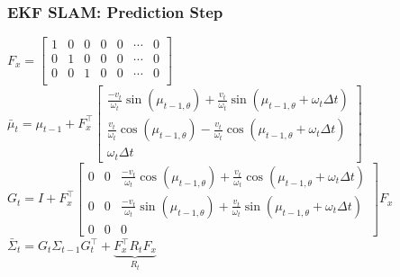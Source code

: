 \begin{frame}
    \frametitle{EKF SLAM: Prediction Step}

    \begin{algorithmic}[1]
        \State $F_x = \begin{bmatrix}
        1 & 0 & 0 & 0 & 0 & \cdots & 0 \\
        0 & 1 & 0 & 0 & 0 & \cdots & 0 \\
        0 & 0 & 1 & 0 & 0 & \cdots & 0 \\
        \end{bmatrix}$
        \vspace{1em}
        \State $\bar{\mu}_t = \mu_{t-1} + F_x^{\top}
        \begin{bmatrix}
        \frac{-v_t}{\omega_t} \sin(\mu_{t-1,\theta}) + \frac{v_t}{\omega_t} \sin(\mu_{t-1,\theta} + \omega_t \Delta t) \\
        \frac{v_t}{\omega_t} \cos(\mu_{t-1,\theta}) - \frac{v_t}{\omega_t} \cos(\mu_{t-1,\theta} + \omega_t \Delta t) \\
        \omega_t \Delta t
        \end{bmatrix}$
        \vspace{1em}
        \State $G_t = I + F_x^{\top}
        \begin{bmatrix}
        0 & 0 & \frac{-v_t}{\omega_t} \cos(\mu_{t-1,\theta}) + \frac{v_t}{\omega_t} \cos(\mu_{t-1,\theta} + \omega_t \Delta t) \\
        0 & 0 & \frac{-v_t}{\omega_t} \sin(\mu_{t-1,\theta}) + \frac{v_t}{\omega_t} \sin(\mu_{t-1,\theta} + \omega_t \Delta t) \\
        0 & 0 & 0
        \end{bmatrix} F_x$
        \vspace{1em}
        \State $\bar{\Sigma}_t = G_t \Sigma_{t-1} G_t^{\top} + \underbrace{F_x^{\top} R_t F_x}_{R_t}$
        \EndProcedure
    \end{algorithmic}
    
\end{frame}

